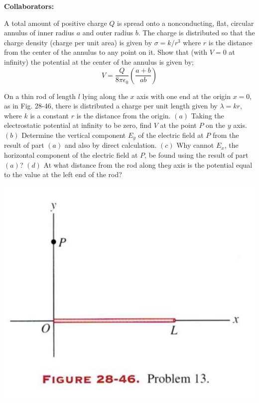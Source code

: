 \documentclass[11pt,letterpaper,boxed]{hmcpset}
\begin{document}
\noindent\textbf{Collaborators:} 


\begin{problem}
A total amount of positive charge $Q$ is spread onto a nonconducting, flat, circular annulus of inner radius $a$ and outer radius $b$. The charge is distributed so that the charge density (charge per unit area) is given by $\sigma = k/r^3$ where $r$ is the distance from the center of the annulus to any point on it. Show that (with $V=0$ at infinity) the potential at the center of the annulus is given by; 
$$ V= \frac{Q}{8\pi \epsilon_0}\left( \frac{a+b}{ab}\right)$$
\end{problem}

\begin{solution}
\vfill
\end{solution}
\newpage

\begin{problem}[HRK 28.13]
On a thin rod of length $l$ lying along the $x$ axis with one end at the origin $x=0$, as in Fig. 28-46, there is distributed a charge per unit length given by $\lambda =kr$, where $k$ is a constant $r$ is the distance from the origin. $(a)$ Taking the electrostatic potential at infinity to be zero, find $V$ at the point $P$ on the $y$ axis. $(b)$ Determine the vertical component $E_y$ of the electric field at $P$ from the result of part $(a)$ and also by direct calculation. $(c)$ Why cannot $E_x$, the horizontal component of the electric field at $P$, be found using the result of part $(a)$? $(d)$ At what distance from the rod along the$y$ axis is the potential equal to the value at the left end of the rod?
\begin{center}
\includegraphics[scale=0.6]{28-46.png}
\end{center}
\end{problem}
\end{document}
